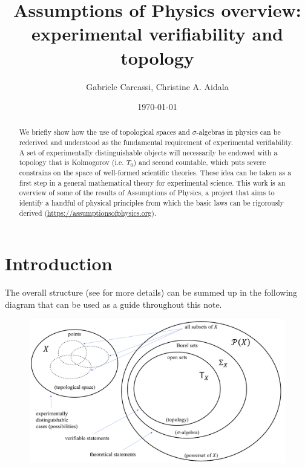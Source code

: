 \documentclass[10pt,twocolumn, nofootinbib]{revtex4-1}
\begin{document}
\title{Assumptions of Physics overview: \\
	experimental verifiability and topology }
\author{Gabriele Carcassi, Christine A. Aidala}

\date{\today}


\begin{abstract}
We briefly show how the use of topological spaces and $\sigma$-algebras in physics can be rederived and understood as the fundamental requirement of experimental verifiability. A set of experimentally distinguishable objects will necessarily be endowed with a topology that is Kolmogorov (i.e. $T_0$) and second countable, which puts severe constrains on the space of well-formed scientific theories. These idea can be taken as a first step in a general mathematical theory for experimental science. This work is an overview of some of the results of Assumptions of Physics, a project that aims to identify a handful of physical principles from which the basic laws can be rigorously derived  (\url{https://assumptionsofphysics.org}).
\end{abstract}

\maketitle

\section{Introduction}

The overall structure (see \cite{AoPBook} for more details) can be summed up in the following diagram that can be used as a guide throughout this note.

\begin{figure}[h]
	\includegraphics[width=\columnwidth]{Diagram.png}
\end{figure}
\end{document}
